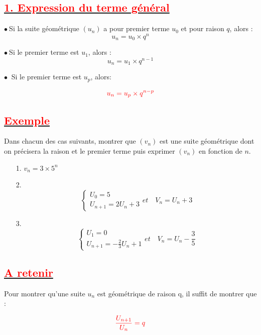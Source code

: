 \documentclass[12pt]{article}
\begin{document}
\subsection*{\underline{\textbf{\textcolor{red}{1. Expression du terme général}}}}
$\bullet\ $Si la suite géométrique $\left(u_{n}\right)$ a pour premier terme $u_{0}$ et pour raison $q$, alors : $$u_{n}=u_{0}\times q^{n}$$

$\bullet\ $Si le premier terme est $u_{1}$, alors :$$u_{n}=u_{1}\times q^{n-1}$$

$\bullet\ $ Si le premier terme est $u_{p}$, alors:
\begin{mdframed}[linecolor=red] %
    \[
    \color{red} u_{n}=u_{p}\times q^{n-p}
    \]
\end{mdframed}
\subsection*{\underline{\textbf{\textcolor{red}{Exemple }}}}
Dans chacun des cas suivants, montrer que $(v_{n})$ est une suite géométrique dont on précisera
la raison et le premier terme puis exprimer $(v_{n})$ en fonction de $n$.
\begin{itemize}
\item[1.]$v_{n} = 3 \times 5^{n}$
\item[2.] \begin{equation*} 
    \begin{cases}
        U_{0}=5 \\
        U_{n + 1}=2U_{n}+3
    \end{cases}
    et\quad V_{n} = U_{n} + 3
\end{equation*}
\item[3.] \begin{equation*} 
    \begin{cases}
        U_{1}=0 \\
        U_{n + 1}=-\frac{2}{3}U_{n}+1
    \end{cases}
    et\quad V_{n} = U_{n} - \frac{3}{5}
\end{equation*}
\end{itemize}
\subsection*{\underline{\textbf{\textcolor{red}{A retenir }}}}
Pour montrer qu’une suite $u_{n}$ est géométrique de raison q, il suffit de montrer que :
\begin{mdframed}[linecolor=red] %
    \[
    \color{red} \dfrac{U_{n+1}}{U_{n}}=q
    \]
\end{mdframed}
\end{document}
